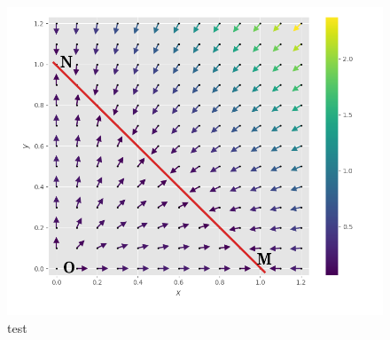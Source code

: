 \documentclass{wsdcr}
\begin{document}
\begin{figure}
    \centering
    \includegraphics[width=\linewidth]{fig/lv2_vf.png}
    \caption{test}
    \label{fig:vf2}
\end{figure}
\end{document}

